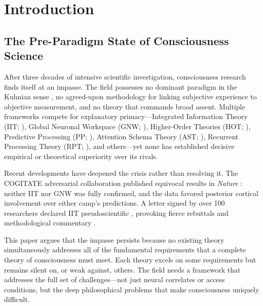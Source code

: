 \documentclass[12pt]{article}
\begin{document}
\section{Introduction}


\subsection{The Pre-Paradigm State of Consciousness Science}

After three decades of intensive scientific investigation, consciousness research finds itself at an impasse. The field possesses no dominant paradigm in the Kuhnian sense \citep{Kuhn1962}, no agreed-upon methodology for linking subjective experience to objective measurement, and no theory that commands broad assent. Multiple frameworks compete for explanatory primacy---\hspace{0pt}Integrated Information Theory (IIT; \citealp{Tononi2004,Albantakis2023}), Global Neuronal Workspace (GNW; \citealp{Baars1988,Dehaene2011}), Higher-Order Theories (HOT; \citealp{Rosenthal2005,Lau2011}), Predictive Processing (PP; \citealp{Friston2010,Seth2021}), Attention Schema Theory (AST; \citealp{Graziano2013}), Recurrent Processing Theory (RPT; \citealp{Lamme2006,Lamme2010}), and others---\hspace{0pt}yet none has established decisive empirical or theoretical superiority over its rivals.

Recent developments have deepened the crisis rather than resolving it. The COGITATE adversarial collaboration published equivocal results in \emph{Nature} \citep{COGITATE2025,Melloni2023}: neither IIT nor GNW was fully confirmed, and the data favored posterior cortical involvement over either camp's predictions. A letter signed by over 100 researchers declared IIT pseudoscientific \citep{IITConcerned2025}, provoking fierce rebuttals \citep{TononiAlbantakis2025} and methodological commentary \citep{GomezMarin2025}.

This paper argues that the impasse persists because no existing theory simultaneously addresses all of the fundamental requirements that a complete theory of consciousness must meet. Each theory excels on some requirements but remains silent on, or weak against, others. The field needs a framework that addresses the full set of challenges---\hspace{0pt}not just neural correlates or access conditions, but the deep philosophical problems that make consciousness uniquely difficult.
\end{document}
